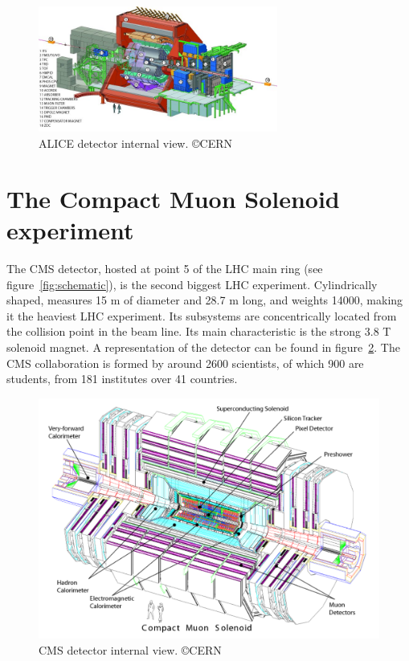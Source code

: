 \begin{figure}[!Hhtbp]
  \begin{center}
    \includegraphics[width=0.7\textwidth]{figs/alice2.jpg}
    \caption{ALICE detector internal view. \copyright CERN}
    \label{fig:alicedet}
  \end{center}
\end{figure}

\section{The Compact Muon Solenoid experiment}
\label{sec:CMS}

The CMS detector, hosted at point 5 of the LHC main ring (see figure~\ref{fig:schematic}), is the second biggest LHC experiment. Cylindrically shaped, measures 15 m of diameter and 28.7 m long, and weights 14000, making it the heaviest LHC experiment. Its subsystems are concentrically located from the collision point in the beam line. Its main characteristic is the strong 3.8 T solenoid magnet. A representation of the detector can be found in figure~\ref{fig:cmsdet}. The CMS collaboration is formed by around 2600 scientists, of which 900 are students, from 181 institutes over 41 countries. 

\begin{figure}[!Hhtbp]
  \begin{center}
    \includegraphics[width=\textwidth]{figs/CMS_det.pdf}
    \caption{CMS detector internal view. \copyright CERN}
    \label{fig:cmsdet}
  \end{center}
\end{figure}


